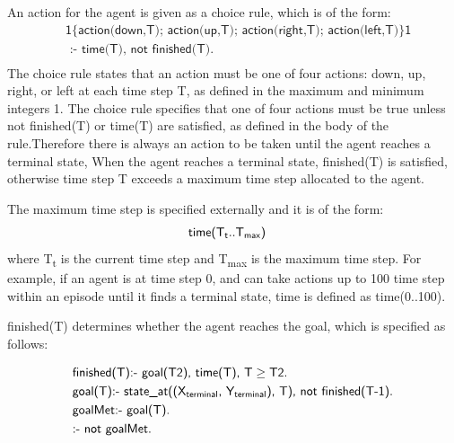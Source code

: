 An action for the agent is given as a choice rule, which is of the form:
\begin{equation}\label{eq:choice_rule}
\begin{split}
&\textsf{1\{action(down,T); action(up,T); action(right,T); action(left,T)\}1} \\
&\textsf{ :- time(T), not finished(T).}\\
\end{split}
\end{equation}
The choice rule states that an action must be one of four actions: \textsf{down}, \textsf{up}, \textsf{right}, or \textsf{left}
at each time step T, as defined in the maximum and minimum integers 1.
The choice rule specifies that one of four actions must be true unless \textsf{not finished(T)} or \textsf{time(T)} are satisfied, as defined in the body of the rule.Therefore there is always an action to be taken until the agent reaches a terminal state, 
When the agent reaches a terminal state, \textsf{finished(T)} is satisfied, otherwise time step T exceeds a maximum time step allocated to the agent.

The maximum time step is  specified externally and it is of the form:
\begin{equation}
\begin{split}
&\textsf{time(T\textsubscript{t}..T\textsubscript{max})}
\end{split}
\end{equation}
where T\textsubscript{t} is the current time step and T\textsubscript{max} is the maximum time step.
For example, if an agent is at time step 0, and can take actions up to 100 time step within an episode until it finds a terminal state, \textsf{time} is defined as \textsf{time(0..100)}.

\textsf{finished(T)} determines whether the agent reaches the goal, which is specified as follows:

\begin{equation}\label{eq:asp_goal}
\begin{split}
&\textsf{finished(T):- goal(T2), time(T), T} \geq \textsf{T2.}\\
&\textsf{goal(T):- state\_at((X\textsubscript{terminal}, Y\textsubscript{terminal}), T), not finished(T-1).}\\
&\textsf{goalMet:- goal(T).}\\
&\textsf{:- not goalMet.}
\end{split}
\end{equation}

